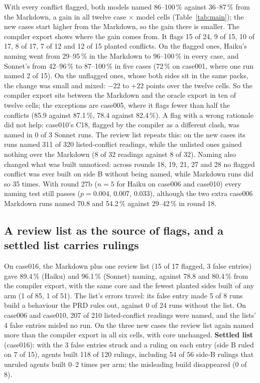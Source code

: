\documentclass{article}
\begin{document}
With every conflict flagged, both models named 86--100\,\% against 36--87\,\% from the Markdown, a gain in all
twelve case $\times$ model cells (Table~\ref{tab:main}); the new cases start higher from the Markdown, so the
gain there is smaller. The compiler export shows where the gain comes from. It flags 15 of 24, 9 of 15, 10
of 17, 8 of 17, 7 of 12 and 12 of 15 planted conflicts. On the flagged ones, Haiku's naming went from
29--95\,\% in the Markdown to 96--100\,\% in every case, and Sonnet's from 42--96\,\% to 87--100\,\% in five cases
(72\,\% on case001, where one run named 2 of 15). On the unflagged ones, whose both sides sit in the same
packs, the change was small and mixed: $-22$ to $+22$ points over the twelve cells. So the compiler export sits
between the Markdown and the oracle export in ten of twelve cells; the exceptions are case005, where it
flags fewer than half the conflicts (85.9 against 87.1\,\%, 78.4 against 82.4\,\%). A flag with a wrong
rationale did not help: case010's C18, flagged by the compiler as a different clash, was named in 0 of 3
Sonnet runs. The review list repeats this: on the new cases its runs named 311 of 320 listed-conflict
readings, while the unlisted ones gained nothing over the Markdown (8 of 32 readings against 8 of 32).
Naming also changed what was built unnoticed: across rounds 18, 19, 21, 27 and 28 no flagged conflict was
ever built on side B without being named, while Markdown runs did so 35 times. With round 27b ($n = 5$ for
Haiku on case006 and case010) every naming test still passes ($p = 0.004$, $0.007$, $0.033$), although the two
extra case006 Markdown runs named 70.8 and 54.2\,\% against 29--42\,\% in round 18.

\subsection{A review list as the source of flags, and a settled list carries rulings}\label{sec:list}

On case016, the Markdown plus one review list (15 of 17 flagged, 3 false entries) gave 89.4\,\% (Haiku) and
96.1\,\% (Sonnet) naming, against 78.8 and 80.4\,\% from the compiler export, with the same core and the fewest
planted sides built of any arm (1 of 85, 1 of 51). The list's errors travel: its false entry made 5 of 8
runs build a behaviour the PRD rules out, against 0 of 24 runs without the list. On case006 and case010,
207 of 210 listed-conflict readings were named, and the lists' 4 false entries misled no run. On the
three new cases the review list again named more than the compiler export in all six cells, with core
unchanged. \textbf{Settled list} (case016): with the 3 false entries struck and a ruling on each entry (side B
ruled on 7 of 15), agents built 118 of 120 rulings, including 54 of 56 side-B rulings that unruled agents
built 0--2 times per arm; the misleading build disappeared (0 of 8).
\end{document}
